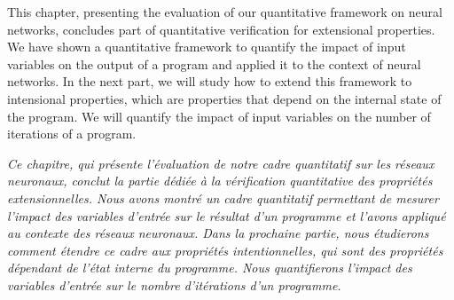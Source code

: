 This chapter, presenting the evaluation of our quantitative framework on neural networks, concludes part of quantitative verification for extensional properties.
We have shown a quantitative framework to quantify the impact of input variables on the output of a program and applied it to the context of neural networks.
In the next part, we will study how to extend this framework to intensional properties, which are properties that depend on the internal state of the program.
We will quantify the impact of input variables on the number of iterations of a program.


\frenchdiv

\emph{Ce chapitre, qui présente l'évaluation de notre cadre quantitatif sur les réseaux neuronaux, conclut la partie dédiée à la vérification quantitative des propriétés extensionnelles. Nous avons montré un cadre quantitatif permettant de mesurer l'impact des variables d'entrée sur le résultat d'un programme et l'avons appliqué au contexte des réseaux neuronaux. Dans la prochaine partie, nous étudierons comment étendre ce cadre aux propriétés intentionnelles, qui sont des propriétés dépendant de l'état interne du programme. Nous quantifierons l'impact des variables d'entrée sur le nombre d'itérations d'un programme.}
